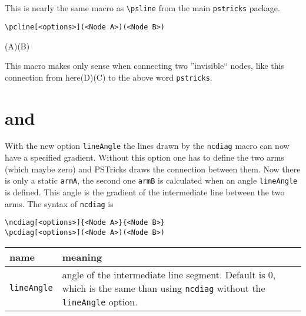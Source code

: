
\section{}
This is nearly the same macro as \verb|\psline| from the main \verb|pstricks| package.
\begin{verbatim}
\pcline[<options>](<Node A>)(<Node B>)
\end{verbatim}

\begin{LTXexample}
%
\hspace*{6cm}
\pclineII[linewidth=5pt](A)(B)
\end{LTXexample}


\begin{LTXexample}
\raggedright This macro makes only sense when connecting two ''invisible`` nodes, 
like this connection from here\pclineII{->}(D)(C){} 
to the above word \verb|pstricks|.
\end{LTXexample}



\section{ and }
With the new option \verb|lineAngle| the lines drawn by the \verb|ncdiag| macro
can now have a specified gradient. Without this option one has to define the two
arms (which maybe zero) and PSTricks draws the connection between them. Now there
is only a static \verb|armA|, the second one \verb|armB| is calculated when an angle
\verb|lineAngle| is defined. This angle is the gradient of the intermediate line
between the two arms. The syntax of \verb|ncdiag| is

\begin{verbatim}
\ncdiag[<options>]{<Node A>}{<Node B>}
\pcdiag[<options>](<Node A>)(<Node B>)
\end{verbatim}


\begin{tabularx}{\linewidth}{l|X}
name & meaning\\\hline
\verb|lineAngle| & angle of the intermediate line segment. Default is 0, which is the same than using \verb|ncdiag| without the \verb|lineAngle| option.\tabularnewline
\end{tabularx}


